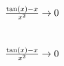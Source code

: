 \begin{spacing}{1.2}
\section*{$\frac{\tan(x)-x}{x^2}\to 0$} \label{DBsin3}
\Fa{

}
\vspace{0.5cm}
\newpage
\section*{$\frac{\tan(x)-x}{x^2}\to 0$} \label{DBsin3Mo}
\Mo{

}
\vspace{0.5cm}
\newpage

\end{spacing}


